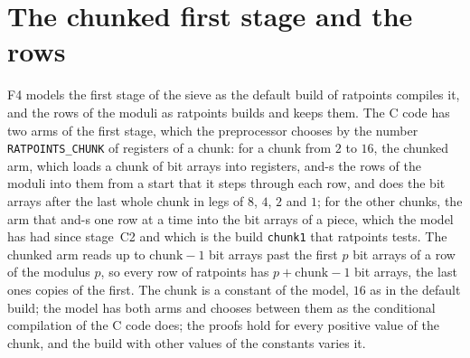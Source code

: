 \chapter{The chunked first stage and the rows}\label{chap:rows}

F4 models the first stage of the sieve as the default build of ratpoints compiles it, and the rows
of the moduli as ratpoints builds and keeps them. The C code has two arms of the first stage, which
the preprocessor chooses by the number \verb|RATPOINTS_CHUNK| of registers of a chunk: for a chunk
from $2$ to $16$, the chunked arm, which loads a chunk of bit arrays into registers, and-s the rows
of the moduli into them from a start that it steps through each row, and does the bit arrays after
the last whole chunk in legs of $8$, $4$, $2$ and $1$; for the other chunks, the arm that and-s one
row at a time into the bit arrays of a piece, which the model has had since stage~C2 and which is
the build \verb|chunk1| that ratpoints tests. The chunked arm reads up to $\mathrm{chunk} - 1$ bit
arrays past the first $p$ bit arrays of a row of the modulus $p$, so every row of ratpoints has
$p + \mathrm{chunk} - 1$ bit arrays, the last ones copies of the first. The chunk is a constant of
the model, $16$ as in the default build; the model has both arms and chooses between them as the
conditional compilation of the C code does; the proofs hold for every positive value of the chunk,
and the build with other values of the constants varies it.

